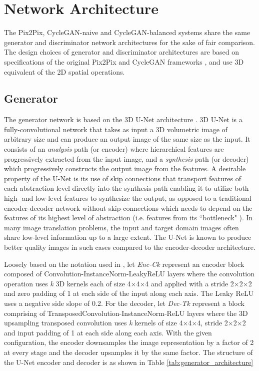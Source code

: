 \section{Network Architecture}
\label{network_architectures}
The Pix2Pix, CycleGAN-naive and CycleGAN-balanced systems share the same generator and discriminator network architectures for the sake of fair comparison. The design choices of generator and discriminator architectures are based on specifications of the original Pix2Pix and CycleGAN frameworks \cite{isola2017image, zhu2017unpaired}, and use 3D equivalent of the 2D spatial operations.

\subsection{Generator}
The generator network is based on the 3D U-Net architecture \cite{cciccek20163d}. 3D U-Net is a fully-convolutional network that takes as input a 3D volumetric image of arbitrary size and can produce an output image of the same size as the input. It consists of an \textit{analysis} path (or encoder) where hierarchical features are progressively extracted from the input image, and a \textit{synthesis} path (or decoder) which progressively constructs the output image from the features. A desirable property of the U-Net is its use of skip connections that transport features of each abstraction level directly into the synthesis path enabling it to utilize both high- and low-level features to synthesize the output, as opposed to a traditional encoder-decoder network without skip-connections which needs to depend on the features of its highest level of abstraction (i.e. features from its ``bottleneck" ). In many image translation problems, the input and target domain images often share low-level information up to a large extent. The U-Net is known to produce better quality images \cite{isola2017image} in such cases compared to the encoder-decoder architecture.

Loosely based on the notation used in \cite{isola2017image}, let \textit{Enc-Ck} represent an encoder block composed of Convolution-InstanceNorm-LeakyReLU layers where the convolution operation uses \textit{k} 3D kernels each of size 4$\times$4$\times$4 and applied with a stride 2$\times$2$\times$2 and zero padding of 1 at each side of the input along each axis. The Leaky ReLU uses a negative side slope of 0.2. For the decoder, let \textit{Dec-Tk} represent a block comprising of TransposedConvolution-InstanceNorm-ReLU layers where the 3D upsampling transposed convolution uses \textit{k} kernels of size 4$\times$4$\times$4, stride 2$\times$2$\times$2 and input padding of 1 at each side along each axis. With the given configuration, the encoder downsamples the image representation by a factor of 2 at every stage and the decoder upsamples it by the same factor. 
The structure of the U-Net encoder and decoder is as shown in Table \ref{tab:generator_architecture}

